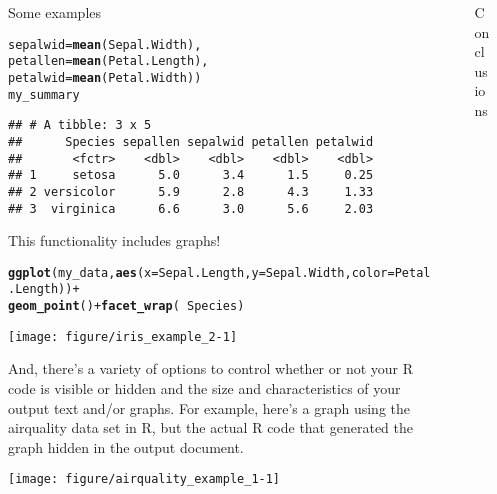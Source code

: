 \documentclass[final]{beamer}\usepackage[]{graphicx}\usepackage[]{color}
\makeatletter
\newcommand{\hlopt}[1]{\textcolor[rgb]{0,0,0}{#1}}%
\newcommand{\hlstd}[1]{\textcolor[rgb]{0.345,0.345,0.345}{#1}}%
\newcommand{\hlkwc}[1]{\textcolor[rgb]{0.333,0.667,0.333}{#1}}%
\newcommand{\hlkwd}[1]{\textcolor[rgb]{0.737,0.353,0.396}{\textbf{#1}}}%
\newenvironment{kframe}{%
 \def\at@end@of@kframe{}%
 \ifinner\ifhmode%
  \def\at@end@of@kframe{\end{minipage}}%
  \begin{minipage}{\columnwidth}%
 \fi\fi%
 \def\FrameCommand##1{\hskip\@totalleftmargin \hskip-\fboxsep
 \colorbox{shadecolor}{##1}\hskip-\fboxsep
     \hskip-\linewidth \hskip-\@totalleftmargin \hskip\columnwidth}%
 \MakeFramed {\advance\hsize-\width
   \@totalleftmargin\z@ \linewidth\hsize
   \@setminipage}}%
 {\par\unskip\endMakeFramed%
 \at@end@of@kframe}
\newenvironment{knitrout}{}{} %
\newlength{\sepwid}
\newlength{\onecolwid}
\newlength{\twocolwid}
\makeatother
\begin{document}
\begin{frame}[t, fragile]
\begin{columns}[T]
\begin{column}{\twocolwid}
\begin{block}{Some examples}
\begin{knitrout}
\begin{kframe}
\begin{alltt}
                                                         \hlkwc{sepalwid}\hlstd{=}\hlkwd{mean}\hlstd{(Sepal.Width),}
                                                         \hlkwc{petallen}\hlstd{=}\hlkwd{mean}\hlstd{(Petal.Length),}
                                                         \hlkwc{petalwid}\hlstd{=}\hlkwd{mean}\hlstd{(Petal.Width))}
\hlstd{my_summary}
\end{alltt}
\begin{verbatim}
## # A tibble: 3 x 5
##      Species sepallen sepalwid petallen petalwid
##       <fctr>    <dbl>    <dbl>    <dbl>    <dbl>
## 1     setosa      5.0      3.4      1.5     0.25
## 2 versicolor      5.9      2.8      4.3     1.33
## 3  virginica      6.6      3.0      5.6     2.03
\end{verbatim}
\end{kframe}
\end{knitrout}

This functionality includes graphs!
\begin{knitrout}
\color{fgcolor}\begin{kframe}
\begin{alltt}
\hlkwd{ggplot}\hlstd{(my_data,} \hlkwd{aes}\hlstd{(}\hlkwc{x}\hlstd{=Sepal.Length,} \hlkwc{y}\hlstd{=Sepal.Width,} \hlkwc{color}\hlstd{=Petal.Length))} \hlopt{+}
     \hlkwd{geom_point}\hlstd{()} \hlopt{+} \hlkwd{facet_wrap}\hlstd{(}\hlopt{~}\hlstd{Species)}
\end{alltt}
\end{kframe}
\texttt{[image: figure/iris\_example\_2-1]} 

\end{knitrout}

And, there's a variety of options to control whether or not your R code is visible or hidden and the size and characteristics of your output text and/or graphs. For example, here's a graph using the airquality data set in R, but the actual R code that generated the graph hidden in the output document.

\begin{knitrout}
\color{fgcolor}
\texttt{[image: figure/airquality\_example\_1-1]} 

\end{knitrout}
				\end{block}
		\end{column} %
		\begin{column}{\sepwid} \end{column} %
		\begin{column}{\onecolwid} %
				\begin{block}{Conclusions}
				\end{block}
		\end{column} %
		\begin{column}{\sepwid}\end{column} %
	\end{columns} %
\end{frame}
\end{document}
